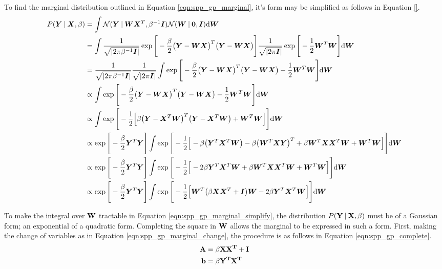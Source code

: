To find the marginal distribution outlined in Equation \ref{eqn:spp_gp_marginal}, it's form may 
be simplified as follows in Equation \ref{}.
\begin{align}
  \label{eqn:spp_gp_marginal_simplify}
  P(\bm{Y} \:\vert\: \bm{X}, \beta) &= \int \mathcal{N}(\bm{Y} \:\vert\: \bm{WX}^{T}, \beta^{-1}\bm{I})
  \mathcal{N}(\bm{W} \:\vert\: \bm{0}, \bm{I}) {\mathrm d{\bm{W}}} \\
  &= \int \frac{1}{\sqrt{\left|2\pi\beta^{-1}\bm{I}\right|}} \exp{ 
  \Bigg[
    -\frac{\beta}{2} \big( \bm{Y} - \bm{WX} \big)^{T} \big( \bm{Y} - \bm{WX} \big) 
  \Bigg]}
  \frac{1}{\sqrt{\left|2\pi\bm{I}\right|}} \exp{ 
  \Bigg[
    -\frac{1}{2} \bm{W}^{T}\bm{W}
  \Bigg]} {\mathrm d{\bm{W}}} \\
  &= \frac{1}{\sqrt{\left|2\pi\beta^{-1}\bm{I}\right|}} \frac{1}{\sqrt{\left|2\pi\bm{I}\right|}} 
  \int \exp{
  \Bigg[
    -\frac{\beta}{2} \big( \bm{Y} - \bm{WX} \big)^{T} \big( \bm{Y} - \bm{WX} \big) 
    -\frac{1}{2} \bm{W}^{T}\bm{W}
  \Bigg]} {\mathrm d{\bm{W}}} \\
  &\propto \int \exp{
  \Bigg[
    -\frac{\beta}{2} \big( \bm{Y} - \bm{WX} \big)^{T} \big( \bm{Y} - \bm{WX} \big) 
    -\frac{1}{2} \bm{W}^{T}\bm{W}
  \Bigg]} {\mathrm d{\bm{W}}} \\
  &\propto \int \exp{ 
  \Bigg[ -\frac{1}{2} \Big[
    \beta \big( \bm{Y} - \bm{X}^{T}\bm{W} \big)^{T} \big( \bm{Y} - \bm{X}^{T}\bm{W} \big) 
    + \bm{W}^{T}\bm{W}
  \Big] \Bigg]} {\mathrm d{\bm{W}}} \\
  &\propto \exp{\Bigg[ -\frac{\beta}{2} \bm{Y}^{T}\bm{Y} \Bigg]} 
  \int \exp{
  \Bigg[ -\frac{1}{2} \Big[
    -\beta \big( \bm{Y}^{T}\bm{X}^{T}\bm{W} \big) 
    -\beta \big( \bm{W}^{T}\bm{XY} \big)^{T}
    +\beta \bm{W}^{T}\bm{XX}^{T}\bm{W}
    + \bm{W}^{T}\bm{W}
  \Big] \Bigg]} {\mathrm d{\bm{W}}} \\
  &\propto \exp{\Bigg[ -\frac{\beta}{2} \bm{Y}^{T}\bm{Y} \Bigg]} 
  \int \exp{
  \Bigg[ -\frac{1}{2} \Big[
    -2\beta \bm{Y}^{T}\bm{X}^{T}\bm{W}
    +\beta \bm{W}^{T}\bm{XX}^{T}\bm{W}
    + \bm{W}^{T}\bm{W}
  \Big] \Bigg]} {\mathrm d{\bm{W}}} \\
  &\propto \exp{\Bigg[ -\frac{\beta}{2} \bm{Y}^{T}\bm{Y} \Bigg]} 
  \int \exp{
  \Bigg[ -\frac{1}{2} \Big[
    \bm{W}^{T} \big( \beta \bm{XX}^{T} + \bm{I} \big) \bm{W}
    -2\beta \bm{Y}^{T}\bm{X}^{T}\bm{W}
  \Big] \Bigg]} {\mathrm d{\bm{W}}}
\end{align}

To make the integral over $\bf{W}$ tractable in Equation \ref{eqn:spp_gp_marginal_simplify}, 
the distribution $P(\bf{Y} \:\vert\: \bf{X}, \beta)$ must be of a Gaussian form; an exponential 
of a quadratic form. Completing the square in $\bf{W}$ allows the marginal to be expressed 
in such a form. First, making the change of variables as in Equation 
\ref{eqn:spp_gp_marginal_change}, the procedure is as follows in Equation \ref{eqn:spp_gp_complete}.
\begin{align}
  \label{eqn:spp_gp_marginal_change}
  \bf{A} &= \beta \bf{XX}^{T} + \bf{I}\\
  \bf{b} &= \beta \bf{Y}^{T} \bf{X}^{T}
\end{align}

